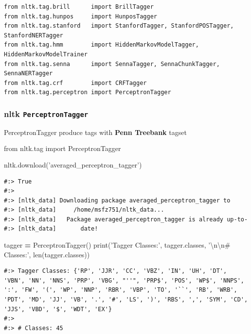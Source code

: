 \documentclass[
]{book}
\newenvironment{Shaded}{\begin{snugshade}}{\end{snugshade}}
\newcommand{\BuiltInTok}[1]{#1}
\newcommand{\CharTok}[1]{\textcolor[rgb]{0.5,0.5,0.5}{#1}}
\newcommand{\ImportTok}[1]{#1}
\newcommand{\NormalTok}[1]{#1}
\newcommand{\OperatorTok}[1]{\textcolor[rgb]{0.43,0.43,0.43}{\textbf{#1}}}
\newcommand{\StringTok}[1]{\textcolor[rgb]{0.5,0.5,0.5}{#1}}
\begin{document}
\begin{verbatim}
from nltk.tag.brill      import BrillTagger
from nltk.tag.hunpos     import HunposTagger
from nltk.tag.stanford   import StanfordTagger, StanfordPOSTagger, StanfordNERTagger
from nltk.tag.hmm        import HiddenMarkovModelTagger, HiddenMarkovModelTrainer
from nltk.tag.senna      import SennaTagger, SennaChunkTagger, SennaNERTagger
from nltk.tag.crf        import CRFTagger
from nltk.tag.perceptron import PerceptronTagger
\end{verbatim}

\hypertarget{nltk-perceptrontagger}{%
\subsubsection{\texorpdfstring{nltk \texttt{PerceptronTagger}}{nltk PerceptronTagger}}\label{nltk-perceptrontagger}}

PerceptronTagger produce tags with \textbf{Penn Treebank} tagset

\begin{Shaded}
\begin{Highlighting}[]
\ImportTok{from}\NormalTok{ nltk.tag }\ImportTok{import}\NormalTok{ PerceptronTagger}

\NormalTok{nltk.download(}\StringTok{'averaged_perceptron_tagger'}\NormalTok{)}
\end{Highlighting}
\end{Shaded}

\begin{verbatim}
#:> True
#:> 
#:> [nltk_data] Downloading package averaged_perceptron_tagger to
#:> [nltk_data]     /home/msfz751/nltk_data...
#:> [nltk_data]   Package averaged_perceptron_tagger is already up-to-
#:> [nltk_data]       date!
\end{verbatim}

\begin{Shaded}
\begin{Highlighting}[]
\NormalTok{tagger }\OperatorTok{=}\NormalTok{ PerceptronTagger()}
\BuiltInTok{print}\NormalTok{(}\StringTok{'Tagger Classes:'}\NormalTok{, tagger.classes, }
      \StringTok{'}\CharTok{\textbackslash{}n\textbackslash{}n}\StringTok{# Classes:'}\NormalTok{, }\BuiltInTok{len}\NormalTok{(tagger.classes))}
\end{Highlighting}
\end{Shaded}

\begin{verbatim}
#:> Tagger Classes: {'RP', 'JJR', 'CC', 'VBZ', 'IN', 'UH', 'DT', 'VBN', 'NN', 'NNS', 'PRP', 'VBG', "''", 'PRP$', 'POS', 'WP$', 'NNPS', ':', 'FW', '(', 'WP', 'NNP', 'RBR', 'VBP', 'TO', '``', 'RB', 'WRB', 'PDT', 'MD', 'JJ', 'VB', '.', '#', 'LS', ')', 'RBS', ',', 'SYM', 'CD', 'JJS', 'VBD', '$', 'WDT', 'EX'} 
#:> 
#:> # Classes: 45
\end{verbatim}
\end{document}
